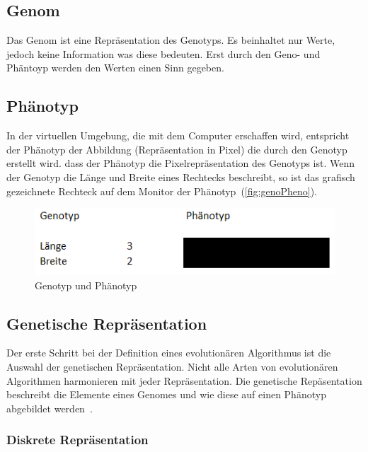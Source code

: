     \subsection{Genom\label{sub:genom}}

      Das Genom ist eine Repräsentation des Genotyps.
      Es beinhaltet nur Werte, jedoch keine Information was diese bedeuten.
      Erst durch den Geno- und Phäntoyp werden den Werten einen Sinn gegeben.

    \subsection{Phänotyp\label{sub:introPhenotyp}}

      In der virtuellen Umgebung, die mit dem Computer erschaffen wird,
      entspricht der Phänotyp der Abbildung (Repräsentation in Pixel) die durch den Genotyp erstellt wird.
      dass der Phänotyp die Pixelrepräsentation des Genotyps ist.
      Wenn der Genotyp die Länge und Breite eines Rechtecks beschreibt,
      so ist das grafisch gezeichnete Rechteck auf dem Monitor der Phänotyp~(\vref{fig:genoPheno}).

      \begin{figure}[H]
        \includegraphics[scale=1]{graphics/genotyp_phenotyp}
        \caption{Genotyp und Phänotyp\label{fig:genoPheno}}
      \end{figure}

    \subsection{Genetische Repräsentation}

      Der erste Schritt bei der Definition eines evolutionären Algorithmus ist die Auswahl der genetischen Repräsentation.
      Nicht alle Arten von evolutionären Algorithmen harmonieren mit jeder Repräsentation.
      Die genetische Repäsentation beschreibt die Elemente eines Genomes und
      wie diese auf einen Phänotyp abgebildet werden~\cite[S.16]{book:bioInspired}.

      \subsubsection{Diskrete Repräsentation\label{subsub:GeneticRepresentationDiscrete}}

